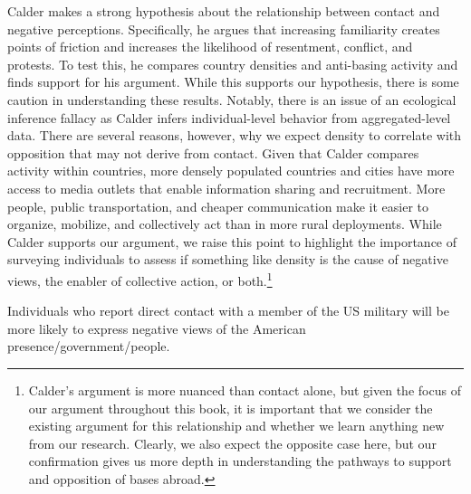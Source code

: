 \begin{subhyp}
	Calder makes a strong hypothesis about the relationship between contact and negative perceptions.\cite{calder2007} Specifically, he argues that increasing familiarity creates points of friction and increases the likelihood of resentment, conflict, and protests. To test this, he compares country densities and anti-basing activity and finds support for his argument. While this supports our hypothesis, there is some caution in understanding these results. Notably, there is an issue of an ecological inference fallacy as Calder infers individual-level behavior from aggregated-level data.\cite{King2004} There are several reasons, however, why we expect density to correlate with opposition that may not derive from contact. Given that Calder compares activity within countries, more densely populated countries and cities have more access to media outlets that enable information sharing and recruitment. More people, public transportation, and cheaper communication make it easier to organize, mobilize, and collectively act than in more rural deployments. While Calder supports our argument, we raise this point to highlight the importance of surveying individuals to assess if something like density is the cause of negative views, the enabler of collective action, or both.\footnote{Calder's argument is more nuanced than contact alone, but given the focus of our argument throughout this book, it is important that we consider the existing argument for this relationship and whether we learn anything new from our research. Clearly, we also expect the opposite case here, but our confirmation gives us more depth in understanding the pathways to support and opposition of bases abroad.}  %
	
	\begin{hyp}
		Individuals who report direct contact with a member of the US military will be more likely to express negative views of the American presence/government/people. 
	\end{hyp}
	

\end{subhyp}
